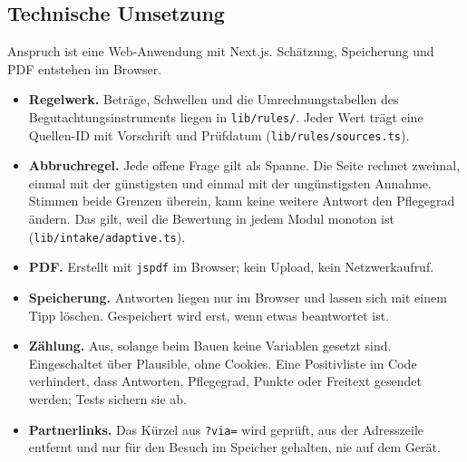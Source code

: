 \documentclass[11pt,a4paper,parskip=half-]{scrartcl}
\begin{document}
\subsection{Technische Umsetzung}
%
Anspruch ist eine Web-Anwendung mit Next.js. Schätzung, Speicherung und PDF entstehen im Browser.
\begin{itemize}
  \item \textbf{Regelwerk.} Beträge, Schwellen und die Umrechnungstabellen des
        Begutachtungsinstruments liegen in \texttt{lib/rules/}. Jeder Wert trägt eine Quellen-ID
        mit Vorschrift und Prüfdatum (\texttt{lib/rules/sources.ts}).
  \item \textbf{Abbruchregel.} Jede offene Frage gilt als Spanne. Die Seite rechnet zweimal,
        einmal mit der günstigsten und einmal mit der ungünstigsten Annahme. Stimmen beide
        Grenzen überein, kann keine weitere Antwort den Pflegegrad ändern. Das gilt, weil die
        Bewertung in jedem Modul monoton ist (\texttt{lib/intake/adaptive.ts}).
  \item \textbf{PDF.} Erstellt mit \texttt{jspdf} im Browser; kein Upload, kein Netzwerkaufruf.
  \item \textbf{Speicherung.} Antworten liegen nur im Browser und lassen sich mit einem Tipp löschen.
        Gespeichert wird erst, wenn etwas beantwortet ist.
  \item \textbf{Zählung.} Aus, solange beim Bauen keine Variablen gesetzt sind. Eingeschaltet über
        Plausible, ohne Cookies. Eine Positivliste im Code verhindert, dass Antworten, Pflegegrad,
        Punkte oder Freitext gesendet werden; Tests sichern sie ab.
  \item \textbf{Partnerlinks.} Das Kürzel aus \texttt{?via=} wird geprüft, aus der Adresszeile
        entfernt und nur für den Besuch im Speicher gehalten, nie auf dem Gerät.
\end{itemize}
\end{document}
